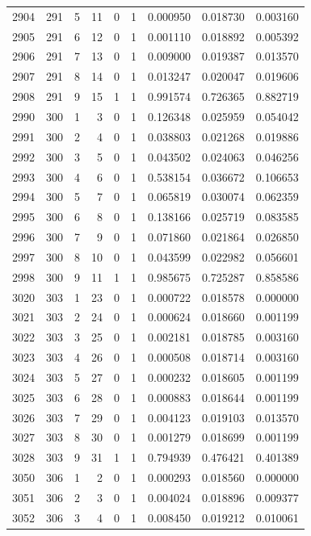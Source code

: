 \begin{longtable}{rrrrrrrrr}
2904 & 291 & 5 & 11 & 0 & 1 & 0.000950 & 0.018730 & 0.003160 \\
2905 & 291 & 6 & 12 & 0 & 1 & 0.001110 & 0.018892 & 0.005392 \\
2906 & 291 & 7 & 13 & 0 & 1 & 0.009000 & 0.019387 & 0.013570 \\
2907 & 291 & 8 & 14 & 0 & 1 & 0.013247 & 0.020047 & 0.019606 \\
2908 & 291 & 9 & 15 & 1 & 1 & 0.991574 & 0.726365 & 0.882719 \\
2990 & 300 & 1 & 3 & 0 & 1 & 0.126348 & 0.025959 & 0.054042 \\
2991 & 300 & 2 & 4 & 0 & 1 & 0.038803 & 0.021268 & 0.019886 \\
2992 & 300 & 3 & 5 & 0 & 1 & 0.043502 & 0.024063 & 0.046256 \\
2993 & 300 & 4 & 6 & 0 & 1 & 0.538154 & 0.036672 & 0.106653 \\
2994 & 300 & 5 & 7 & 0 & 1 & 0.065819 & 0.030074 & 0.062359 \\
2995 & 300 & 6 & 8 & 0 & 1 & 0.138166 & 0.025719 & 0.083585 \\
2996 & 300 & 7 & 9 & 0 & 1 & 0.071860 & 0.021864 & 0.026850 \\
2997 & 300 & 8 & 10 & 0 & 1 & 0.043599 & 0.022982 & 0.056601 \\
2998 & 300 & 9 & 11 & 1 & 1 & 0.985675 & 0.725287 & 0.858586 \\
3020 & 303 & 1 & 23 & 0 & 1 & 0.000722 & 0.018578 & 0.000000 \\
3021 & 303 & 2 & 24 & 0 & 1 & 0.000624 & 0.018660 & 0.001199 \\
3022 & 303 & 3 & 25 & 0 & 1 & 0.002181 & 0.018785 & 0.003160 \\
3023 & 303 & 4 & 26 & 0 & 1 & 0.000508 & 0.018714 & 0.003160 \\
3024 & 303 & 5 & 27 & 0 & 1 & 0.000232 & 0.018605 & 0.001199 \\
3025 & 303 & 6 & 28 & 0 & 1 & 0.000883 & 0.018644 & 0.001199 \\
3026 & 303 & 7 & 29 & 0 & 1 & 0.004123 & 0.019103 & 0.013570 \\
3027 & 303 & 8 & 30 & 0 & 1 & 0.001279 & 0.018699 & 0.001199 \\
3028 & 303 & 9 & 31 & 1 & 1 & 0.794939 & 0.476421 & 0.401389 \\
3050 & 306 & 1 & 2 & 0 & 1 & 0.000293 & 0.018560 & 0.000000 \\
3051 & 306 & 2 & 3 & 0 & 1 & 0.004024 & 0.018896 & 0.009377 \\
3052 & 306 & 3 & 4 & 0 & 1 & 0.008450 & 0.019212 & 0.010061 \\

\end{longtable}
